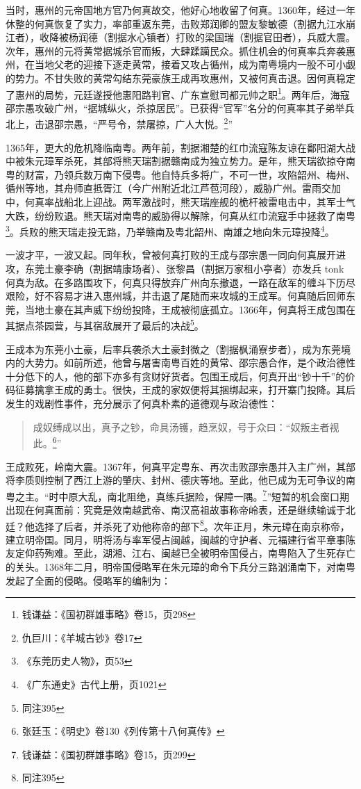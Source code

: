 当时，惠州的元帝国地方官乃何真故交，他好心地收留了何真。1360年，经过一年休整的何真恢复了实力，率部重返东莞，击败郑润卿的盟友黎敏德（割据九江水崩江者），收降被杨润德（割据水心镇者）打败的梁国瑞（割据官田者），兵威大震。次年，惠州的元将黄常据城杀官而叛，大肆蹂躏民众。抓住机会的何真率兵奔袭惠州，在当地父老的迎接下逐走黄常，接着又攻占循州，成为南粤境内一股不可小觑的势力。不甘失败的黄常勾结东莞豪族王成再攻惠州，又被何真击退。因何真稳定了惠州的局势，元廷遂授他惠阳路判官、广东宣慰司都元帅之职\footnote{钱谦益：《国初群雄事略》卷15，页298}。两年后，海寇邵宗愚攻破广州，“据城纵火，杀掠居民”。已获得“官军”名分的何真率其子弟举兵北上，击退邵宗愚，“严号令，禁屠掠，广人大悦。\footnote{仇巨川：《羊城古钞》卷17}”

1365年，更大的危机降临南粤。两年前，割据湘楚的红巾流寇陈友谅在鄱阳湖大战中被朱元璋军杀死，其部将熊天瑞割据赣南成为独立势力。是年，熊天瑞欲掠夺南粤的财富，乃领兵数万南下侵粤。他自恃兵多将广，不可一世，攻陷韶州、梅州、循州等地，其舟师直抵胥江（今广州附近北江芦苞河段），威胁广州。雷雨交加中，何真率战船北上迎战。两军激战时，熊天瑞座舰的桅杆被雷电击中，其军士气大跌，纷纷败退。熊天瑞对南粤的威胁得以解除，何真从红巾流寇手中拯救了南粤\footnote{《东莞历史人物》，页53}。兵败的熊天瑞走投无路，乃举赣南及粤北韶州、南雄之地向朱元璋投降\footnote{《广东通史》古代上册，页1021}。

一波才平，一波又起。同年秋，曾被何真打败的王成与邵宗愚一同向何真展开进攻，东莞土豪李确（割据靖康场者）、张黎昌（割据万家租小亭者）亦发兵 tonk 何真为敌。在多路围攻下，何真只得放弃广州向东撤退，一路在敌军的缠斗下历尽艰险，好不容易才进入惠州城，并击退了尾随而来攻城的王成军。何真随后回师东莞，当地土豪在其声威下纷纷投降，王成被彻底孤立。1366年，何真将王成包围在其据点茶园营，与其宿敌展开了最后的决战\footnote{同注395}。

王成本为东莞小土豪，后率兵袭杀大土豪封微之（割据枫涌寮步者），成为东莞境内的大势力。如前所述，他曾与屠害南粤百姓的黄常、邵宗愚合作，是个政治德性十分低下的人，他的部下亦多有贪财好货者。包围王成后，何真开出“钞十千”的价码征募擒拿王成的勇士。很快，王成的家奴便将其捆绑起来，打开寨门投降。其后发生的戏剧性事件，充分展示了何真朴素的道德观与政治德性：

\begin{quote}
	成奴缚成以出，真予之钞，命具汤镬，趋烹奴，号于众曰：“奴叛主者视此。\footnote{张廷玉：《明史》卷130《列传第十八何真传》}”
\end{quote}

王成败死，岭南大震。1367年，何真平定粤东、再次击败邵宗愚并入主广州，其部将李质则控制了西江上游的肇庆、封州、德庆等地。至此，他已成为无可争议的南粤之主。“时中原大乱，南北阻绝，真练兵据险，保障一隅。\footnote{钱谦益：《国初群雄事略》卷15，页299}”短暂的机会窗口期出现在何真面前：究竟是效南越武帝、南汉高祖故事称帝岭表，还是继续输诚于北廷？他选择了后者，并杀死了劝他称帝的部下\footnote{同注395}。次年正月，朱元璋在南京称帝，建立明帝国。同月，明将汤与率军侵占闽越，闽越的守护者、元福建行省平章事陈友定仰药殉难。至此，湖湘、江右、闽越已全被明帝国侵占，南粤陷入了生死存亡的关头。1368年二月，明帝国侵略军在朱元璋的命令下兵分三路汹涌南下，对南粤发起了全面的侵略。侵略军的编制为：

